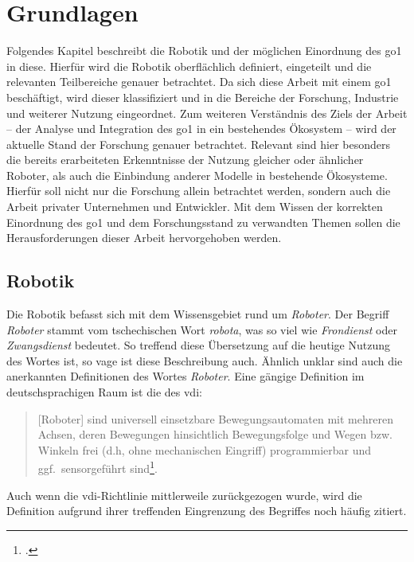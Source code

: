 \section{Grundlagen}
\label{sec:grundlagen}
Folgendes Kapitel beschreibt die Robotik und der möglichen Einordnung des \gls{go1} in diese.
Hierfür wird die Robotik oberflächlich definiert, eingeteilt und die relevanten Teilbereiche genauer betrachtet.
Da sich diese Arbeit mit einem \gls{go1} beschäftigt, wird dieser klassifiziert und in die Bereiche der Forschung, Industrie und weiterer Nutzung eingeordnet.
Zum weiteren Verständnis des Ziels der Arbeit -- der Analyse und Integration des \gls{go1} in ein bestehendes Ökosystem --
wird der aktuelle Stand der Forschung genauer betrachtet.
Relevant sind hier besonders die bereits erarbeiteten Erkenntnisse der Nutzung gleicher oder ähnlicher Roboter, als auch
die Einbindung anderer Modelle in bestehende Ökosysteme.
Hierfür soll nicht nur die Forschung allein betrachtet werden, sondern auch die Arbeit privater Unternehmen und Entwickler.
Mit dem Wissen der korrekten Einordnung des \gls{go1} und dem Forschungsstand zu verwandten Themen sollen die Herausforderungen dieser
Arbeit hervorgehoben werden.

\subsection{Robotik}
\label{subsec:robotik}

Die Robotik befasst sich mit dem Wissensgebiet rund um \emph{Roboter}.
Der Begriff \emph{Roboter} stammt vom tschechischen Wort \emph{robota}, was so viel wie \emph{Frondienst} oder \emph{Zwangsdienst} bedeutet.
So treffend diese Übersetzung auf die heutige Nutzung des Wortes ist, so vage ist diese Beschreibung auch.
Ähnlich unklar sind auch die anerkannten Definitionen des Wortes \emph{Roboter}.
Eine gängige Definition im deutschsprachigen Raum ist die des \gls{vdi}:

\begin{quote}
[Roboter]
    sind universell einsetzbare Bewegungsautomaten mit mehreren Achsen,
    deren Bewegungen hinsichtlich Bewegungsfolge und Wegen bzw.
    Winkeln frei (d.h, ohne mechanischen Eingriff) programmierbar und ggf.~sensorgeführt sind\footcite{vdi_2860}.
\end{quote}

\noindent Auch wenn die \gls{vdi}-Richtlinie mittlerweile zurückgezogen wurde, wird die Definition aufgrund ihrer treffenden Eingrenzung
des Begriffes noch häufig zitiert.


